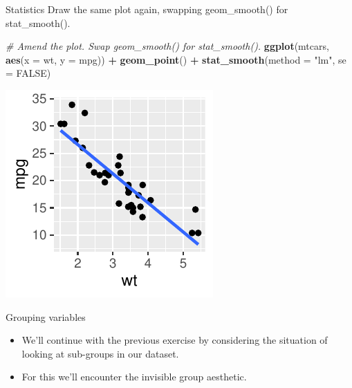 \documentclass[
  ignorenonframetext,
]{beamer}
\newenvironment{Shaded}{\begin{snugshade}}{\end{snugshade}}
\newcommand{\AttributeTok}[1]{\textcolor[rgb]{0.13,0.29,0.53}{#1}}
\newcommand{\CommentTok}[1]{\textcolor[rgb]{0.56,0.35,0.01}{\textit{#1}}}
\newcommand{\ConstantTok}[1]{\textcolor[rgb]{0.56,0.35,0.01}{#1}}
\newcommand{\FunctionTok}[1]{\textcolor[rgb]{0.13,0.29,0.53}{\textbf{#1}}}
\newcommand{\NormalTok}[1]{#1}
\newcommand{\SpecialCharTok}[1]{\textcolor[rgb]{0.81,0.36,0.00}{\textbf{#1}}}
\newcommand{\StringTok}[1]{\textcolor[rgb]{0.31,0.60,0.02}{#1}}
\begin{document}
\begin{frame}[fragile]{Statistics}
\label{statistics-8}
Draw the same plot again, swapping geom\_smooth() for stat\_smooth().


\begin{Shaded}
\begin{Highlighting}[]
\CommentTok{\# Amend the plot. Swap geom\_smooth() for stat\_smooth().}
\FunctionTok{ggplot}\NormalTok{(mtcars, }\FunctionTok{aes}\NormalTok{(}\AttributeTok{x =}\NormalTok{ wt, }\AttributeTok{y =}\NormalTok{ mpg)) }\SpecialCharTok{+} \FunctionTok{geom\_point}\NormalTok{() }\SpecialCharTok{+} \FunctionTok{stat\_smooth}\NormalTok{(}\AttributeTok{method =} \StringTok{"lm"}\NormalTok{,}
    \AttributeTok{se =} \ConstantTok{FALSE}\NormalTok{)}
\end{Highlighting}
\end{Shaded}

\begin{center}\includegraphics[width=0.5\linewidth]{Figs/unnamed-chunk-5-1} \end{center}
\end{frame}

\begin{frame}{Grouping variables}
\label{grouping-variables}
\begin{itemize}
\item
  We'll continue with the previous exercise by considering the situation
  of looking at sub-groups in our dataset.
\item
  For this we'll encounter the invisible group aesthetic.
\end{itemize}
\end{frame}
\end{document}
